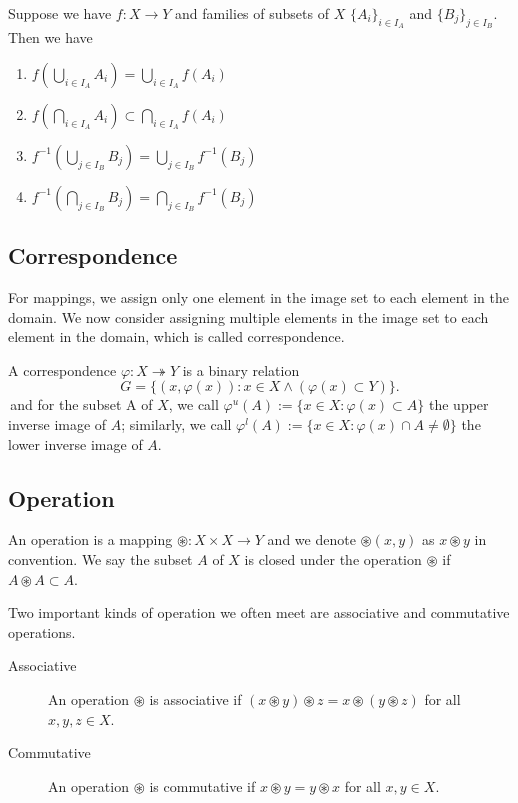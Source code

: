 \begin{proposition}
    Suppose we have $f:X\to Y$ and families of subsets of $X$ $\{A_i\}_{i\in I_A}$ and $\{B_j\}_{j\in I_B}$. Then we have
    \begin{enumerate}
        \item $f\left(\bigcup_{i\in I_A} A_i\right) = \bigcup_{i\in I_A} f(A_i)$
        \item $f\left(\bigcap_{i\in I_A} A_i\right) \subset \bigcap_{i\in I_A} f(A_i)$
        \item $f^{-1}\left(\bigcup_{j\in I_B} B_j\right) = \bigcup_{j\in I_B} f^{-1}(B_j)$
        \item $f^{-1}\left(\bigcap_{j\in I_B} B_j\right) = \bigcap_{j\in I_B} f^{-1}(B_j)$
    \end{enumerate}
\end{proposition}

\subsection{Correspondence}
For mappings, we assign only one element in the image set to each element in the domain. We now consider assigning multiple elements in the image set to each element in the domain, which is called correspondence.
\begin{definition}[Correspondence]
    A correspondence $\varphi : X \twoheadrightarrow Y$ is a binary relation 
    $$G=\{(x,\varphi(x)) : x \in X \land (\varphi(x) \subset Y)\}.$$ 
    \,and for the subset A of $X$, we call $\varphi^{u} (A):=\{x\in X: \varphi(x) \subset A\}$ the upper inverse image of $A$; similarly, we call $\varphi^{l} (A):=\{x\in X: \varphi(x) \cap A \neq \emptyset\}$ the lower inverse image of $A$.
\end{definition}


\subsection{Operation}
An operation is a mapping $\circledast: X \times X \to Y$ and we denote $\circledast(x,y)$ as $x \circledast y$ in convention. We say the subset $A$ of $X$ is closed under the operation $\circledast$ if $A \circledast A \subset A$.

Two important kinds of operation we often meet are associative and commutative operations.
\begin{description}
    \item[Associative] An operation $\circledast$ is associative if $(x \circledast y) \circledast z = x \circledast (y \circledast z)$ for all $x,y,z \in X$.
    \item[Commutative] An operation $\circledast$ is commutative if $x \circledast y = y \circledast x$ for all $x,y \in X$.
\end{description}

